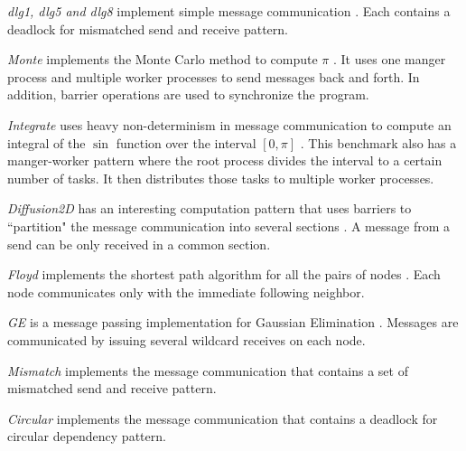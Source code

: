  

\textit{dlg1, dlg5 and dlg8} implement simple message communication \cite{DBLP:conf/fm/ForejtKNS14}. Each contains a deadlock for mismatched send and receive pattern. 

\textit{Monte} implements the Monte Carlo method to compute $\pi$ \cite{benchmark:mentoCarlo}. It uses one manger process and multiple worker processes to send messages back and forth. In addition, barrier operations are used to synchronize the program. 

\textit{Integrate} uses heavy non-determinism in message communication to compute an integral of the $\sin$ function over the interval $[0, \pi]$ \cite{benchmark:fevs}. This benchmark also has a manger-worker pattern where the root process divides the interval to a certain number of tasks. It then distributes those tasks to multiple worker processes. 

 
\textit{Diffusion2D} has an interesting computation pattern that uses barriers to ``partition" the message communication into several sections \cite{benchmark:fevs}. A message from a send can be only received in a common section. 


\textit{Floyd} implements the shortest path algorithm for all the pairs of nodes \cite{DBLP:conf/ppopp/XueLWGCZZV09}. Each node communicates only with the immediate following neighbor.

\textit{GE} is a message passing implementation for Gaussian Elimination  \cite{DBLP:conf/ppopp/XueLWGCZZV09}. Messages are communicated by issuing several wildcard receives on each node. 

\textit{Mismatch} implements the message communication that contains a set of mismatched send and receive pattern. 

\textit{Circular} implements the message communication that contains a deadlock for circular dependency pattern.


